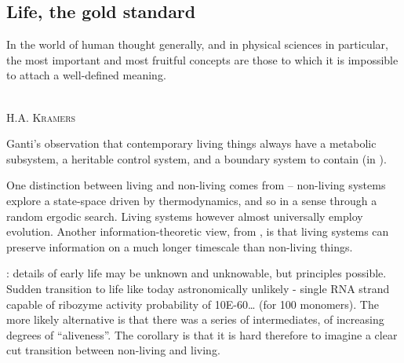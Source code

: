 \subsection{Life, the gold standard}

\epigraph{%
	In the world of human thought generally, and in physical sciences in particular, the most important and most fruitful concepts are those to which it is impossible to attach a well-defined meaning.}%
{\textsc{\\H.A. Kramers}}


	Ganti's observation that contemporary living things always have a
	metabolic subsystem, a heritable control system, and a boundary system
	to contain (in \autocite{Szathmary:2006ty}).
	
	One distinction between living and non-living comes from \autocite{Rasmussen2004} -- non-living systems explore a state-space driven by thermodynamics, and so in a sense through a random ergodic search. Living systems however almost universally employ evolution. Another information-theoretic view, from \autocite{Adami2015}, is that living systems can preserve information on a much longer timescale than non-living things.
	
	\autocite{Pascal2013}: details of early life may be unknown and unknowable, but principles possible. Sudden transition to life like today astronomically unlikely - single RNA strand capable of ribozyme activity probability of 10E-60\ldots{} (for 100 monomers). The more likely alternative is that there was a series of intermediates, of increasing degrees of ``aliveness''. The corollary is that it is hard therefore to imagine a clear cut transition between non-living and living.
	
